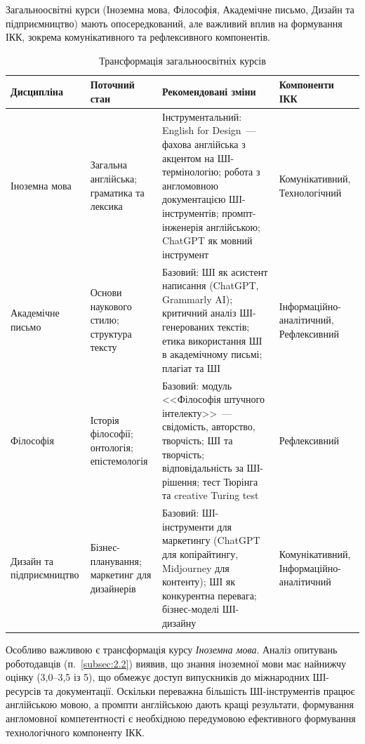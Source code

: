 Загальноосвітні курси (Іноземна мова, Філософія, Академічне письмо, Дизайн та підприємництво) мають опосередкований, але важливий вплив на формування ІКК, зокрема комунікативного та рефлексивного компонентів.

\begin{table}[htbp]
\centering
\caption{Трансформація загальноосвітніх курсів}\label{tab:general-transform}
\small
\begin{tabularx}{\textwidth}{@{}p{}p{}p{}p{}@{}}
\toprule
\textbf{Дисципліна} & \textbf{Поточний стан} & \textbf{Рекомендовані зміни} & \textbf{Компоненти ІКК} \\
\midrule
Іноземна мова & Загальна англійська; граматика та лексика & Інструментальний: English for Design~--- фахова англійська з акцентом на ШІ-термінологію; робота з англомовною документацією ШІ-інструментів; промпт-інженерія англійською; ChatGPT як мовний інструмент & Комунікативний, Технологічний \\
\addlinespace
Академічне письмо & Основи наукового стилю; структура тексту & Базовий: ШІ як асистент написання (ChatGPT, Grammarly AI); критичний аналіз ШІ-генерованих текстів; етика використання ШІ в академічному письмі; плагіат та ШІ & Інформаційно-аналітичний, Рефлексивний \\
\addlinespace
Філософія & Історія філософії; онтологія; епістемологія & Базовий: модуль <<Філософія штучного інтелекту>>~--- свідомість, авторство, творчість; ШІ та творчість; відповідальність за ШІ-рішення; тест Тюрінга та creative Turing test & Рефлексивний \\
\addlinespace
Дизайн та підприємництво & Бізнес-планування; маркетинг для дизайнерів & Базовий: ШІ-інструменти для маркетингу (ChatGPT для копірайтингу, Midjourney для контенту); ШІ як конкурентна перевага; бізнес-моделі ШІ-дизайну & Комунікативний, Інформаційно-аналітичний \\
\bottomrule
\end{tabularx}
\end{table}

Особливо важливою є трансформація курсу \textit{Іноземна мова}. Аналіз опитувань роботодавців (п.~\ref{subsec:2.2}) виявив, що знання іноземної мови має найнижчу оцінку (3,0--3,5 із 5), що обмежує доступ випускників до міжнародних ШІ-ресурсів та документації. Оскільки переважна більшість ШІ-інструментів працює англійською мовою, а промпти англійською дають кращі результати, формування англомовної компетентності є необхідною передумовою ефективного формування технологічного компоненту ІКК.

